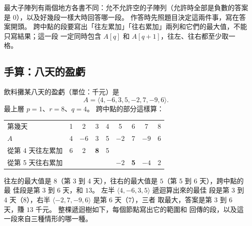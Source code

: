 \begin{examnote}
最大子陣列有兩個地方各書不同：允不允許空的子陣列（允許時全部是負數的答案是
$0$），以及好幾段一樣大時回答哪一段。 作答時先照題目決定這兩件事，寫在答案開頭。
跨中點的段要寫出「往左累加」「往右累加」兩列和它們的最大值，不能只寫結果；這一段
一定同時包含 $A[q]$ 和 $A[q+1]$，往左、往右都至少取一格。
\end{examnote}

\subsection{手算：八天的盈虧}

飲料攤某八天的盈虧（單位：千元）是
\[
A = \langle 4, -6, 3, 5, -2, 7, -9, 6 \rangle .
\]
最上層 $p = 1$、$r = 8$、$q = 4$。 跨中點的部分這樣算：

\begin{center}
\begin{tabular}{l*{8}{c}}
\toprule
第幾天 & 1 & 2 & 3 & 4 & 5 & 6 & 7 & 8 \\
$A$ & 4 & $-6$ & 3 & 5 & $-2$ & 7 & $-9$ & 6 \\
\midrule
從第 4 天往左累加 & 6 & 2 & \textbf{8} & 5 & & & & \\
從第 5 天往右累加 & & & & & $-2$ & \textbf{5} & $-4$ & 2 \\
\bottomrule
\end{tabular}
\end{center}

往左的最大值是 $8$（第 3 到 4 天），往右的最大值是 $5$（第 5 到 6 天），跨中點的最
佳段是第 3 到 6 天，和 $13$。 左半 $\langle 4, -6, 3, 5 \rangle$ 遞迴算出來的最佳
段是第 3 到 4 天（$8$），右半 $\langle -2, 7, -9, 6 \rangle$ 是第 6 天（$7$），三者
取最大，答案是第 3 到 6 天，賺 $13$ 千元。 整棵遞迴樹如下，每個節點寫出它的範圍和
回傳的段，以及這一段來自三種情形的哪一種。

